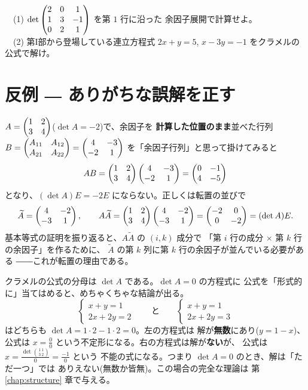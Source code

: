 \begin{mondai}\label{q:cramer}
　(1) $\det \begin{pmatrix}2 & 0 & 1 \\ 1 & 3 & -1 \\ 0 & 2 & 1\end{pmatrix}$ を第 $1$ 行に沿った
余因子展開で計算せよ。\\
　(2) 第I部から登場している連立方程式
$2x + y = 5$, $x - 3y = -1$ をクラメルの公式で解け。
\end{mondai}

\section{反例 ― ありがちな誤解を正す}

\begin{hanrei}\label{hanrei:adj-transpose}
$A = \begin{pmatrix}1 & 2 \\ 3 & 4\end{pmatrix}$($\det A = -2$)で、余因子を
\textbf{計算した位置のまま}並べた行列 $B = \begin{pmatrix}A_{11} & A_{12} \\ A_{21} & A_{22}\end{pmatrix}
= \begin{pmatrix}4 & -3 \\ -2 & 1\end{pmatrix}$ を「余因子行列」と思って掛けてみると
\[
AB = \begin{pmatrix}1 & 2 \\ 3 & 4\end{pmatrix} \begin{pmatrix}4 & -3 \\ -2 & 1\end{pmatrix}
= \begin{pmatrix}0 & -1 \\ 4 & -5\end{pmatrix}
\]
となり、$(\det A)E = -2E$ にならない。正しくは転置の並びで
\[
\widetilde{A} = \begin{pmatrix}4 & -2 \\ -3 & 1\end{pmatrix}, \qquad
A\widetilde{A} = \begin{pmatrix}1 & 2 \\ 3 & 4\end{pmatrix} \begin{pmatrix}4 & -2 \\ -3 & 1\end{pmatrix}
= \begin{pmatrix}-2 & 0 \\ 0 & -2\end{pmatrix} = (\det A)E.
\]
基本等式の証明を振り返ると、$A\widetilde{A}$ の $(i,k)$ 成分で
「第 $i$ 行の成分 $\times$ 第 $k$ 行の余因子」を作るために、
$\widetilde{A}$ の第 $k$ 列に第 $k$ 行の余因子が並んでいる必要がある
――これが転置の理由である。
\end{hanrei}

\begin{hanrei}[$\det A = 0$ ではクラメルの公式は使えない]\label{hanrei:cramer-zero}
クラメルの公式の分母は $\det A$ である。$\det A = 0$ の方程式に
公式を「形式的に」当てはめると、めちゃくちゃな結論が出る。
\[
\begin{cases} x + y = 1 \\ 2x + 2y = 2 \end{cases}
\qquad\text{と}\qquad
\begin{cases} x + y = 1 \\ 2x + 2y = 3 \end{cases}
\]
はどちらも $\det A = 1 \cdot 2 - 1 \cdot 2 = 0$。左の方程式は
解が\textbf{無数}にあり($y = 1 - x$)、公式は
$x = \frac{0}{0}$ という不定形になる。右の方程式は解が\textbf{ない}が、
公式は $x = \frac{\det \binom{1\ 1}{3\ 2}}{0} = \frac{-1}{0}$ という
不能の式になる。つまり $\det A = 0$ のとき、解は「ただ一つ」では
ありえない(無数か皆無)。この場合の完全な理論は
第 \ref{chap:structure} 章で与える。
\end{hanrei}

